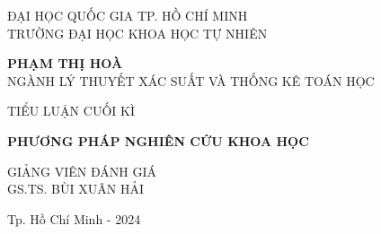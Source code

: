 \begin{center}
\fontsize{14}{16}\selectfont
{ĐẠI HỌC QUỐC GIA TP. HỒ CHÍ MINH}\\
{TRƯỜNG ĐẠI HỌC KHOA HỌC TỰ NHIÊN}\\

\hfill

\vspace*{2cm}

\fontsize{14}{16}\selectfont
{\bf  PHẠM THỊ HOÀ}\\
{NGÀNH LÝ THUYẾT XÁC SUẤT VÀ THỐNG KÊ TOÁN HỌC}

\vspace*{3cm}
\fontsize{20}{22}\selectfont
{TIỂU LUẬN CUỐI KÌ }

\vspace*{1cm}
\fontsize{24}{22}\selectfont
{\bf PHƯƠNG PHÁP NGHIÊN CỨU KHOA HỌC}

\vspace*{3cm}
\fontsize{13}{16}\selectfont
GIẢNG VIÊN ĐÁNH GIÁ\\
GS.TS. BÙI XUÂN HẢI



\vfill
\fontsize{12}{16}\selectfont
{Tp. Hồ Chí Minh - 2024}
\end{center}

